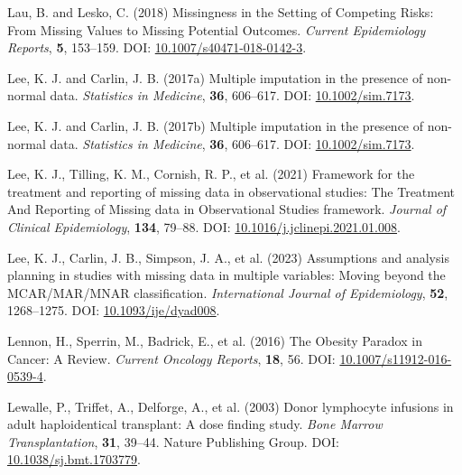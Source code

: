 \documentclass[
  letterpaper,
  DIV=11,
  numbers=noendperiod]{scrreprt}
\newlength{\cslhangindent}
\newenvironment{CSLReferences}[2] %
 {\begin{list}{}{%
  \setlength{\itemindent}{0pt}
  \setlength{\leftmargin}{0pt}
  \setlength{\parsep}{0pt}
  \ifodd #1
   \setlength{\leftmargin}{\cslhangindent}
   \setlength{\itemindent}{-1\cslhangindent}
  \fi
  \setlength{\itemsep}{#2\baselineskip}}}
 {\end{list}}
\begin{document}
\begin{CSLReferences}{1}{1}
Lau, B. and Lesko, C. (2018) Missingness in the {Setting} of {Competing
Risks}: From {Missing Values} to {Missing Potential Outcomes}.
\emph{Current Epidemiology Reports}, \textbf{5}, 153--159. DOI:
\href{https://doi.org/10.1007/s40471-018-0142-3}{10.1007/s40471-018-0142-3}.

Lee, K. J. and Carlin, J. B. (2017a) Multiple imputation in the presence
of non-normal data. \emph{Statistics in Medicine}, \textbf{36},
606--617. DOI:
\href{https://doi.org/10.1002/sim.7173}{10.1002/sim.7173}.

Lee, K. J. and Carlin, J. B. (2017b) Multiple imputation in the presence
of non-normal data. \emph{Statistics in Medicine}, \textbf{36},
606--617. DOI:
\href{https://doi.org/10.1002/sim.7173}{10.1002/sim.7173}.

Lee, K. J., Tilling, K. M., Cornish, R. P., et al. (2021) Framework for
the treatment and reporting of missing data in observational studies:
{The Treatment And Reporting} of {Missing} data in {Observational
Studies} framework. \emph{Journal of Clinical Epidemiology},
\textbf{134}, 79--88. DOI:
\href{https://doi.org/10.1016/j.jclinepi.2021.01.008}{10.1016/j.jclinepi.2021.01.008}.

Lee, K. J., Carlin, J. B., Simpson, J. A., et al. (2023) Assumptions and
analysis planning in studies with missing data in multiple variables:
Moving beyond the {MCAR}/{MAR}/{MNAR} classification.
\emph{International Journal of Epidemiology}, \textbf{52}, 1268--1275.
DOI: \href{https://doi.org/10.1093/ije/dyad008}{10.1093/ije/dyad008}.

Lennon, H., Sperrin, M., Badrick, E., et al. (2016) The {Obesity
Paradox} in {Cancer}: A {Review}. \emph{Current Oncology Reports},
\textbf{18}, 56. DOI:
\href{https://doi.org/10.1007/s11912-016-0539-4}{10.1007/s11912-016-0539-4}.

Lewalle, P., Triffet, A., Delforge, A., et al. (2003) Donor lymphocyte
infusions in adult haploidentical transplant: A dose finding study.
\emph{Bone Marrow Transplantation}, \textbf{31}, 39--44. Nature
Publishing Group. DOI:
\href{https://doi.org/10.1038/sj.bmt.1703779}{10.1038/sj.bmt.1703779}.


\end{CSLReferences}
\end{document}
